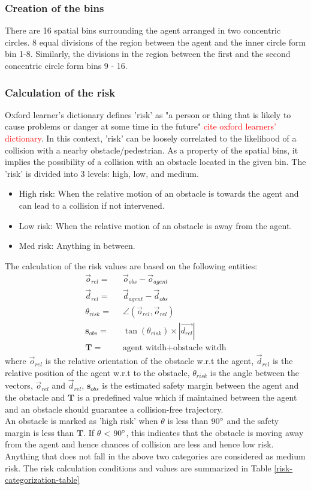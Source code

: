 \subsubsection*{Creation of the bins}
There are 16 spatial bins surrounding the agent arranged in two concentric circles. 8 equal divisions of the region between the agent and the inner circle form bin 1-8. Similarly, the divisions in the region between the first and the second concentric circle form bins 9 - 16.
\subsubsection*{Calculation of the risk}
Oxford learner's dictionary defines 'risk' as "a person or thing that is likely to cause problems or danger at some time in the future" \textcolor{red}{cite oxford learners' dictionary}. In this context, 'risk' can be loosely correlated to the likelihood of a collision with a nearby obstacle/pedestrian. As a property of the spatial bins, it implies the possibility of a collision with an obstacle located in the given bin. 
The 'risk' is divided into 3 levels: high, low, and medium.
\begin{itemize}
    \item High risk:
When the relative motion of an obstacle is towards the agent and can lead to a collision if not intervened.
    \item Low risk:
When the relative motion of an obstacle is away from the agent.
    \item Med risk:
Anything in between.
\end{itemize}
The calculation of the risk values are based on the following entities:
\begin{align}
    \vec{o}_{rel} = & \;\; \vec{o}_{obs} - \vec{o}_{agent}  \\
    \vec{d}_{rel} =  &\;\; \vec{d}_{agent} - \vec{d}_{obs} \\
    \theta_{risk} =  & \;\; \angle (\vec{o}_{rel}, \vec{o}_{rel}) \\
    \mathbf{s}_{obs} = & \;\; \tan(\theta_{risk}) \times |\vec{d_{rel}}| \\
    \mathbf{T} = & \;\; \text{agent witdh} + \text{obstacle witdh}
\end{align}
where $\vec{o}_{rel}$ is the relative orientation of the obstacle w.r.t the agent, $\vec{d}_{rel}$ is the relative position of the agent w.r.t to the obstacle, $\theta_{risk}$ is the angle between the vectors, $\vec{o}_{rel}$ and $\vec{d}_{rel}$,  $\mathbf{s}_{obs}$ is the estimated safety margin between the agent and the obstacle and $\mathbf{T}$ is a predefined value which if maintained between the agent and an obstacle should guarantee a collision-free trajectory.\\
An obstacle is marked as 'high risk' when $\theta$ is less than $90\degree$ and the safety margin is less than $\mathbf{T}$. If $\theta$ < $90 \degree$, this indicates that the obstacle is moving away from the agent and hence chances of collision are less and hence low risk. Anything that does not fall in the above two categories are considered as medium risk. The risk calculation conditions and values are summarized in Table \ref{risk-categorization-table}

